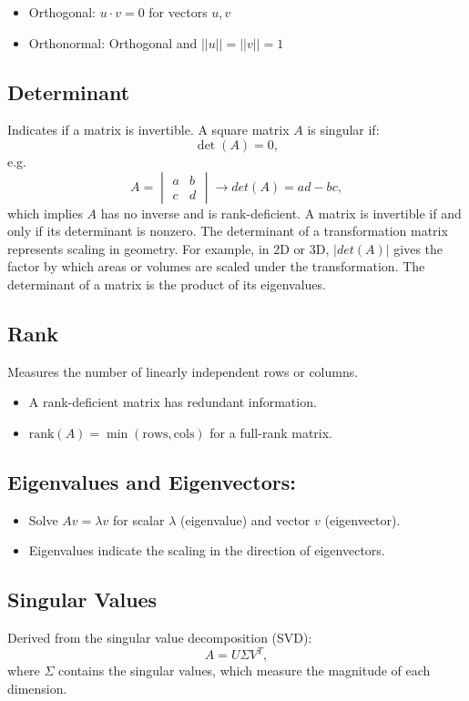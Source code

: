 \documentclass[12pt,a4paper]{article}
\begin{document}
\begin{itemize}
\item Orthogonal: $u \cdot v = 0$ for vectors $u,v$
\item Orthonormal: Orthogonal and $||u||=||v||=1$
\end{itemize}
\subsection{Determinant} Indicates if a matrix is invertible. A square matrix $A$ is singular if:
    \[ \det(A) = 0, \]
    e.g. \[{\displaystyle A =  {\begin{vmatrix}a&b\\c&d\end{vmatrix}}\rightarrow det(A)=ad-bc,}\]
    which implies $A$ has no inverse and is rank-deficient. A matrix is invertible if and only if its determinant is nonzero. The determinant of a transformation matrix represents scaling in geometry. For example, in 2D or 3D, $|det(A)|$ gives the factor by which areas or volumes are scaled under the transformation. The determinant of a matrix is the product of its eigenvalues.
\subsection{Rank} Measures the number of linearly independent rows or columns.
    \begin{itemize}
        \item A rank-deficient matrix has redundant information.
        \item $\text{rank}(A) = \min(\text{rows}, \text{cols})$ for a full-rank matrix.
    \end{itemize}
\subsection{Eigenvalues and Eigenvectors:}
    \begin{itemize}
        \item Solve $Av = \lambda v$ for scalar $\lambda$ (eigenvalue) and vector $v$ (eigenvector).
        \item Eigenvalues indicate the scaling in the direction of eigenvectors.
    \end{itemize}
\subsection{Singular Values} Derived from the singular value decomposition (SVD):
    \[ A = U\Sigma V^T, \]
    where $\Sigma$ contains the singular values, which measure the magnitude of each dimension.
\end{document}
